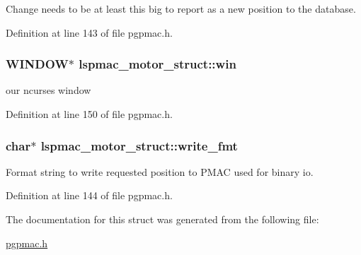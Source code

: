 Change needs to be at least this big to report as a new position to the database. 



Definition at line 143 of file pgpmac.\-h.

\hypertarget{structlspmac__motor__struct_a133775154b0e008f3a2fde6f53bc0eff}{
\subsubsection[{win}]{\setlength{\rightskip}{0pt plus 5cm}W\-I\-N\-D\-O\-W$\ast$ lspmac\-\_\-motor\-\_\-struct\-::win}}\label{structlspmac__motor__struct_a133775154b0e008f3a2fde6f53bc0eff}


our ncurses window 



Definition at line 150 of file pgpmac.\-h.

\hypertarget{structlspmac__motor__struct_a70291ddfe7994c0bec7fc2287cb6dd89}{
\subsubsection[{write\-\_\-fmt}]{\setlength{\rightskip}{0pt plus 5cm}char$\ast$ lspmac\-\_\-motor\-\_\-struct\-::write\-\_\-fmt}}\label{structlspmac__motor__struct_a70291ddfe7994c0bec7fc2287cb6dd89}


Format string to write requested position to P\-M\-A\-C used for binary io. 



Definition at line 144 of file pgpmac.\-h.



The documentation for this struct was generated from the following file\-:\begin{DoxyCompactItemize}
\item 
\hyperlink{pgpmac_8h}{pgpmac.\-h}\end{DoxyCompactItemize}
